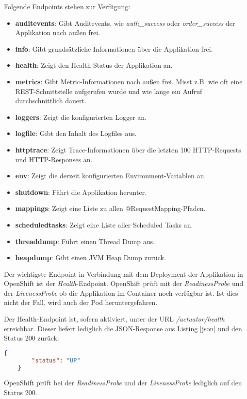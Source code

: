 Folgende Endpoints stehen zur Verfügung:
\begin{itemize}
	\item \textbf{auditevents}: Gibt Auditevents, wie \textit{auth\_success} oder \textit{order\_success} der Applikation nach außen frei.
	\item \textbf{info}: Gibt grundsätzliche Informationen über die Applikation frei. 
	\item \textbf{health}: Zeigt den Health-Status der Applikation an.
	\item \textbf{metrics}: Gibt Metric-Informationen nach außen frei. Misst z.B. wie oft eine REST-Schnittstelle aufgerufen wurde und wie lange ein Aufruf durchschnittlich dauert.
	\item \textbf{loggers}: Zeigt die konfigurierten Logger an.
	\item \textbf{logfile}: Gibt den Inhalt des Logfiles aus.
	\item \textbf{httptrace}: Zeigt Trace-Informationen über die letzten 100 HTTP-Requests und HTTP-Responses an.
	\item \textbf{env}: Zeigt die derzeit konfigurierten Environment-Variablen an.
	\item \textbf{shutdown}: Fährt die Applikation herunter.
	\item \textbf{mappings}: Zeigt eine Liste zu allen @RequestMapping-Pfaden. 
	\item \textbf{scheduledtasks}: Zeigt eine Liste aller Scheduled Tasks an.
	\item \textbf{threaddump}: Führt einen Thread Dump aus.
	\item \textbf{heapdump}: Gibt einen JVM Heap Dump zurück.
\end{itemize}

Der wichtigste Endpoint in Verbindung mit dem Deployment der Applikation in OpenShift ist der \textit{Health}-Endpoint. OpenShift prüft mit der \textit{ReadinessProbe} und der \textit{LivenessProbe} ob die Applikation im Container noch verfügbar ist. Ist dies nicht der Fall, wird auch der Pod heruntergefahren.

Der Health-Endpoint ist, sofern aktiviert, unter der URL \textit{/actuator/health} erreichbar. Dieser liefert lediglich die JSON-Response aus Listing \ref{json} und den Status 200 zurück:
\begin{lstlisting}[language=json, caption=Healt-Endpoint, label=json]
	{
		"status": "UP"
	}
\end{lstlisting}

OpenShift prüft bei der \textit{ReadinessProbe} und der \textit{LivenessProbe} lediglich auf den Status 200. 

